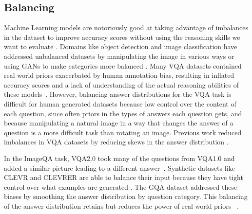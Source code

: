 \documentclass[10pt,twocolumn,letterpaper]{article}
\newcommand{\mgm}[1]{{\color{cyan}{mgm: #1}}}
\begin{document}
\subsection{Balancing}

Machine Learning models are notoriously good at taking advantage of imbalances in the dataset to improve accuracy scores without using the reasoning skills we want to evaluate \cite{hudson2019gqa, goyal2017making, johnson2017clevr, mariani2018bagan, shorten2019survey}. Domains like object detection and image classification have addressed unbalanced datasets by manipulating the image in various ways or using GANs to make categories more balanced \cite{mariani2018bagan, shorten2019survey}. Many VQA datasets contained real world priors exacerbated by human annotation bias, resulting in inflated accuracy scores and a lack of understanding of the actual reasoning abilities of these models~\cite{goyal2017making,hudson2019gqa}. However, balancing answer distributions for the VQA task is difficult for human generated datasets because low control over the content of each question, since often priors in the types of answers each question gets, and because manipulating a natural image in a way that changes the answer of a question is a more difficult task than rotating an image. Previous work reduced imbalances in VQA datasets by reducing skews in the answer distribution \cite{hudson2019gqa, goyal2017making, johnson2017clevr}.

In the ImageQA task, VQA2.0 took many of the questions from VQA1.0 and added a similar picture leading to a different answer~\cite{goyal2017making}. Synthetic datasets like CLEVR and CLEVRER are able to balance their input because they have tight control over what examples are generated \cite{johnson2017clevr, yi2019clevrer}. The GQA dataset addressed these biases by smoothing the answer distribution by question category. This balancing of the answer distribution retains but reduces the power of real world priors ~\cite{hudson2019gqa}. 
\end{document}
